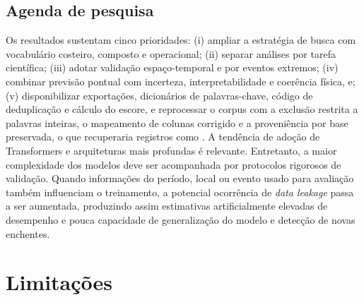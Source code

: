 \subsection{Agenda de pesquisa}

Os resultados sustentam cinco prioridades: (i) ampliar a estratégia de busca com vocabulário costeiro, composto e operacional; (ii) separar análises por tarefa científica; (iii) adotar validação espaço-temporal e por eventos extremos; (iv) combinar previsão pontual com incerteza, interpretabilidade e coerência física, e; (v) disponibilizar exportações, dicionários de palavras-chave, código de deduplicação e cálculo do escore, e reprocessar o corpus com a exclusão restrita a palavras inteiras, o mapeamento de colunas corrigido e a proveniência por base preservada, o que recuperaria registros como . A tendência de adoção de Transformers e arquiteturas mais profundas é relevante. Entretanto, a maior complexidade dos modelos deve ser acompanhada por protocolos rigorosos de validação. Quando informações do período, local ou evento usado para avaliação também influenciam o treinamento, a potencial ocorrência de \textit{data leakage} passa a ser aumentada, produzindo assim estimativas artificialmente elevadas de desempenho e pouca capacidade de generalização do modelo e detecção de novas enchentes.

\section{Limitações}
\label{sec:art-limitacoes}

